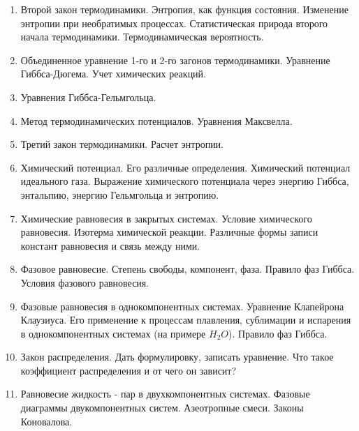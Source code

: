 \begin{enumerate}
\item 
Второй закон термодинамики. Энтропия, как функция состояния. Изменение энтропии при необратимых процессах. Статистическая природа второго начала термодинамики.  Термодинамическая вероятность.

\item 
Объединенное уравнение 1-го и 2-го загонов термодинамики. Уравнение Гиббса-Дюгема. Учет химических реакций.

\item 
Уравнения Гиббса-Гельмгольца.

\item
Метод термодинамических потенциалов. Уравнения Максвелла. 

\item 
Третий закон термодинамики. Расчет энтропии.
 
\item 
Химический потенциал. Его различные определения. Химический потенциал идеального газа. Выражение химического потенциала через энергию Гиббса, энтальпию,  энергию Гельмгольца и энтропию.
 
\item 
Химические равновесия в закрытых системах. Условие химического равновесия. Изотерма химической реакции. Различные формы записи констант равновесия и связь между ними. 
 
\item 
Фазовое равновесие. Степень свободы, компонент, фаза. Правило фаз Гиббса. Условия фазового равновесия. 

\item 
Фазовые равновесия в однокомпонентных системах. Уравнение Клапейрона Клаузиуса. Его применение к процессам плавления, сублимации и испарения в однокомпонентных системах (на примере $H_{2}O$). Правило фаз Гиббса.

\item
Закон распределения. Дать формулировку, записать уравнение. Что такое коэффициент распределения и от чего он зависит?

\item 
Равновесие жидкость - пар в двухкомпонентных системах. Фазовые диаграммы двукомпонентных систем. Азеотропные смеси. Законы Коновалова.

\end{enumerate}

